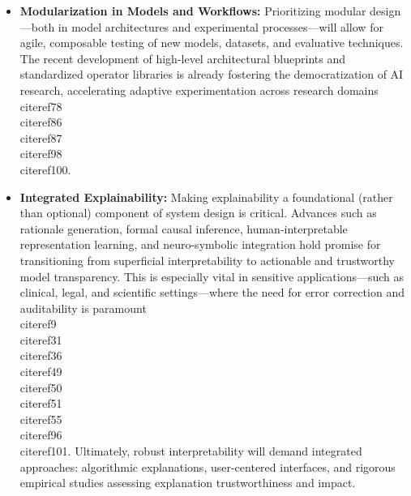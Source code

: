 \documentclass[11pt]{article}
\begin{document}
\begin{itemize}
    \item \textbf{Modularization in Models and Workflows:} Prioritizing modular design—both in model architectures and experimental processes—will allow for agile, composable testing of new models, datasets, and evaluative techniques. The recent development of high-level architectural blueprints and standardized operator libraries is already fostering the democratization of AI research, accelerating adaptive experimentation across research domains~\\cite{ref78}\\cite{ref86}\\cite{ref87}\\cite{ref98}\\cite{ref100}.
    
    \item \textbf{Integrated Explainability:} Making explainability a foundational (rather than optional) component of system design is critical. Advances such as rationale generation, formal causal inference, human-interpretable representation learning, and neuro-symbolic integration hold promise for transitioning from superficial interpretability to actionable and trustworthy model transparency. This is especially vital in sensitive applications—such as clinical, legal, and scientific settings—where the need for error correction and auditability is paramount~\\cite{ref9}\\cite{ref31}\\cite{ref36}\\cite{ref49}\\cite{ref50}\\cite{ref51}\\cite{ref55}\\cite{ref96}\\cite{ref101}. Ultimately, robust interpretability will demand integrated approaches: algorithmic explanations, user-centered interfaces, and rigorous empirical studies assessing explanation trustworthiness and impact.
    

\end{itemize}
\end{document}
